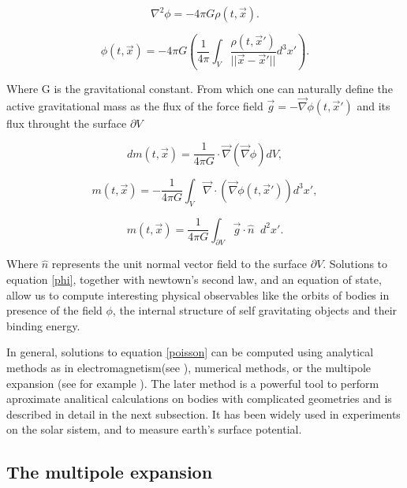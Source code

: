 \begin{equation}\label{poisson}
\nabla^2 \phi = -4\pi G \rho(t, \vec{x}).
\end{equation}

\begin{equation}\label{phi}
\phi(t, \vec{x}) = -4\pi G \left( \frac{1}{4\pi} \int_{V} \frac{\rho(t, \vec{x}')}{|| \vec{x}-\vec{x}' ||} d^3x'\right).
\end{equation}

Where G is the gravitational constant. From which one can naturally define the active gravitational mass as the flux of the force field $\vec{g}=-\vec{\nabla} \phi(t, \vec{x}')$ and its flux throught the surface $\partial V$ 

\begin{equation}
dm(t, \vec{x}) = \frac{1}{4\pi G} \cdot \vec{\nabla}(\vec{\nabla}\phi) dV,
\end{equation}

\begin{equation}
m(t, \vec{x}) = -\frac{1}{4\pi G}\int_{V} \vec{\nabla} \cdot (\vec{\nabla} \phi(t, \vec{x}')) d^3 x' ,
\end{equation}

\begin{equation}\label{active mass}
m(t, \vec{x}) = \frac{1}{4\pi G}\int_{\partial V}  \vec{g}\cdot \hat{n}  \;\; d^2 x'.
\end{equation}


Where $\hat{n}$ represents the unit normal vector field to the surface $\partial V$. Solutions to equation \ref{phi}, together with newtown's second law, and an equation of state, allow us to compute interesting physical observables like the orbits of bodies in presence of the field $\phi$, the internal structure of self gravitating objects and their binding energy.


In general, solutions to equation \ref{poisson} can be computed using analytical methods as in electromagnetism(see \cite{Jackson:1998nia}), numerical methods, or the multipole expansion (see for example \cite{Thorne:1980ru}). The later method is a powerful tool to perform aproximate analitical calculations on bodies with complicated geometries and is described in detail in the next subsection. It has been widely used in experiments on the solar sistem, and to measure earth's surface potential\cite{GOCE, GRACE}. 


\subsection{The multipole expansion}


